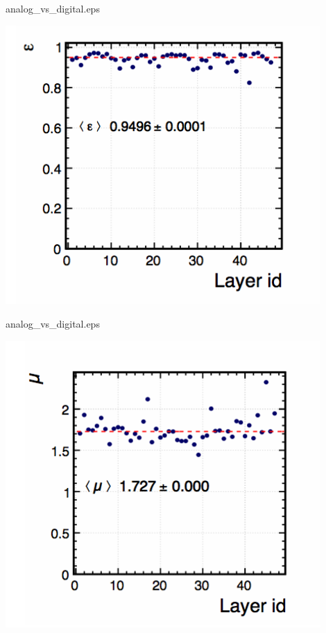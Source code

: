 \documentclass[10pt]{beamer}
\begin{document}
\begin{frame}{analog\_vs\_digital.eps}
    \centerline{\includegraphics[width=0.9\textwidth]{images/Beam2012Efficiency}}
\end{frame}
\begin{frame}{analog\_vs\_digital.eps}
    \centerline{\includegraphics[width=0.9\textwidth]{images/Beam2012Multiplicity}}
\end{frame}
\end{document}
